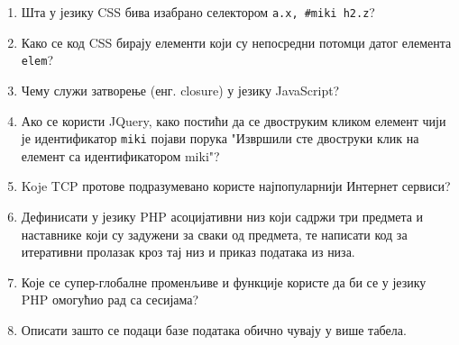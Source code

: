 \documentclass[a4paper]{article}
\begin{document}
\begin{enumerate}
\hrulefill

\hrulefill

\item Шта у језику CSS бива изабрано селектором \verb|а.x, #miki h2.z|?

\hrulefill

\hrulefill

\hrulefill

\item Како се код CSS бирају елементи који су
непосредни потомци датог елемента \verb|elem|?

\hrulefill

\hrulefill

\hrulefill

\item Чему служи затворење (енг. closure) у језику JavaScript?

\hrulefill

\hrulefill

\hrulefill

\item Ако се користи JQuery, како постићи да се двоструким кликом елемент чији је идентификатор \verb|miki| појави порука "Извршили сте двоструки клик 
на елемент са идентификатором miki"?

\hrulefill

\hrulefill

\hrulefill

\item Koje TCP протове подразумевано користе најпопуларнији Интернет сервиси?

\hrulefill

\hrulefill

\item Дефинисати у језику PHP асоцијативни низ који садржи три предмета и наставнике 
који су задужени за сваки од предмета, те написати код за
итеративни пролазак кроз тај низ и приказ података из низа.

\hrulefill

\hrulefill

\hrulefill

\item Које се супер-глобалне променљиве и функције користе да би се у језику PHP омогућио рад са сесијама?

\hrulefill

\hrulefill

\hrulefill

\item Описати зашто се подаци базе података обично чувају у више табела.


\end{enumerate}
\end{document}
